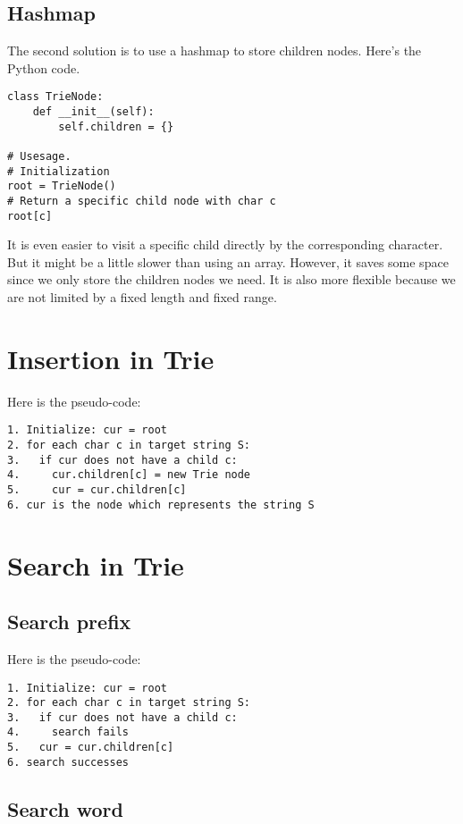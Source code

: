 \subsection{Hashmap}

The second solution is to use a hashmap to store children nodes.
Here's the Python code.
\begin{lstlisting}
class TrieNode:
    def __init__(self):
        self.children = {}

# Usesage.
# Initialization
root = TrieNode()
# Return a specific child node with char c
root[c]
\end{lstlisting}

It is even easier to visit a specific child directly by the corresponding character.
But it might be a little slower than using an array.
However, it saves some space since we only store the children nodes we need.
It is also more flexible because we are not limited by a fixed length and fixed range.

\section{Insertion in Trie}


Here is the pseudo-code:
\begin{lstlisting}
1. Initialize: cur = root
2. for each char c in target string S:
3.   if cur does not have a child c:
4.     cur.children[c] = new Trie node
5.     cur = cur.children[c]
6. cur is the node which represents the string S  
\end{lstlisting}



\section{Search in Trie}

\subsection{Search prefix}

Here is the pseudo-code:
\begin{lstlisting}
1. Initialize: cur = root
2. for each char c in target string S:
3.   if cur does not have a child c:
4.     search fails
5.   cur = cur.children[c]
6. search successes  
\end{lstlisting}


\subsection{Search word}


